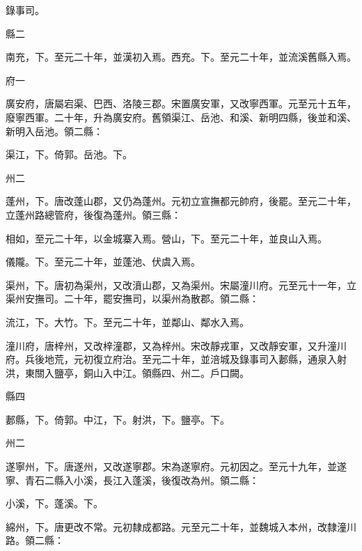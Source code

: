 \begin{pinyinscope}
 錄事司。



 縣二



 南充，下。至元二十年，並漢初入焉。西充。下。至元二十年，並流溪舊縣入焉。



 府一



 廣安府，唐屬宕渠、巴西、洛陵三郡。宋置廣安軍，又改寧西軍。元至元十五年，廢寧西軍。二十年，升為廣安府。舊領渠江、岳池、和溪、新明四縣，後並和溪、新明入岳池。領二縣：



 渠江，下。倚郭。岳池。下。



 州二



 蓬州，下。唐改蓬山郡，又仍為蓬州。元初立宣撫都元帥府，後罷。至元二十年，立蓬州路總管府，後復為蓬州。領三縣：



 相如，至元二十年，以金城寨入焉。營山，下。至元二十年，並良山入焉。



 儀隴。下。至元二十年，並蓬池、伏虞入焉。



 渠州，下。唐初為渠州，又改濆山郡，又為渠州。宋屬潼川府。元至元十一年，立渠州安撫司。二十年，罷安撫司，以渠州為散郡。領二縣：



 流江，下。大竹。下。至元二十年，並鄰山、鄰水入焉。



 潼川府，唐梓州，又改梓潼郡，又為梓州。宋改靜戎軍，又改靜安軍，又升潼川府。兵後地荒，元初復立府治。至元二十年，並涪城及錄事司入郪縣，通泉入射洪，東關入鹽亭，銅山入中江。領縣四、州二。戶口闕。



 縣四



 郪縣，下。倚郭。中江，下。射洪，下。鹽亭。下。



 州二



 遂寧州，下。唐遂州，又改遂寧郡。宋為遂寧府。元初因之。至元十九年，並遂寧、青石二縣入小溪，長江入蓬溪，後復改為州。領二縣：



 小溪，下。蓬溪。下。



 綿州，下。唐更改不常。元初隸成都路。元至元二十年，並魏城入本州，改隸潼川路。領二縣：




\end{pinyinscope}
